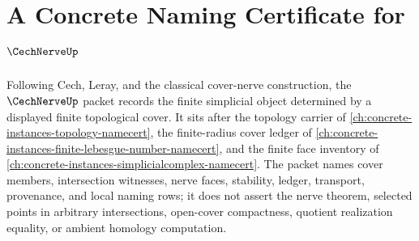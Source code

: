 \chapter{A Concrete Naming Certificate for $\CechNerveUp$}
\label{ch:concrete-instances-cech-nerve-namecert}

Following Cech, Leray, and the classical cover-nerve construction, the $\CechNerveUp$ packet records the finite simplicial object determined by a displayed finite topological cover. It sits after the topology carrier of \autoref{ch:concrete-instances-topology-namecert}, the finite-radius cover ledger of \autoref{ch:concrete-instances-finite-lebesgue-number-namecert}, and the finite face inventory of \autoref{ch:concrete-instances-simplicialcomplex-namecert}. The packet names cover members, intersection witnesses, nerve faces, stability, ledger, transport, provenance, and local naming rows; it does not assert the nerve theorem, selected points in arbitrary intersections, open-cover compactness, quotient realization equality, or ambient homology computation.

